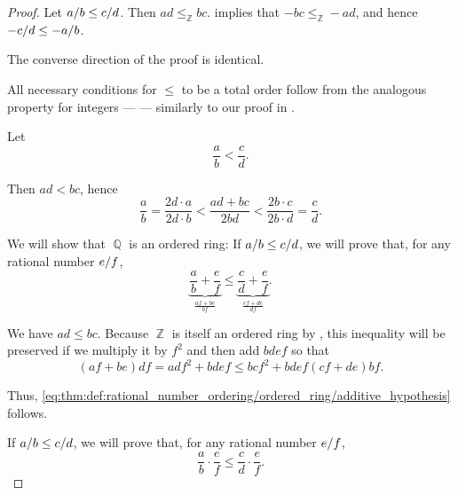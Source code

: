 \begin{proof}
   Let \( \ifrac a b \leq \ifrac c d \). Then \( ad \leq_\BbbZ bc \).  implies that \( -bc \leq_\BbbZ -ad \), and hence \( - \ifrac c d \leq - \ifrac a b \).

  The converse direction of the proof is identical.

   All necessary conditions for \( \leq \) to be a total order follow from the analogous property for integers ---  --- similarly to our proof in .

   Let
  \begin{equation*}
    \frac a b < \frac c d.
  \end{equation*}

  Then \( ad < bc \), hence
  \begin{equation*}
    \frac a b = \frac {2d \cdot a} {2d \cdot b} < \frac {ad + bc} {2bd} < \frac {2b \cdot c} {2b \cdot d} = \frac c d.
  \end{equation*}

   We will show that \( \BbbQ \) is an ordered ring:
   If \( \ifrac a b \leq \ifrac c d \), we will prove that, for any rational number \( \ifrac e f \),
  \begin{equation}\label{eq:thm:def:rational_number_ordering/ordered_ring/additive_hypothesis}
    \underbrace{\frac a b + \frac e f}_{\frac {af + be} {bf}} \leq \underbrace{\frac c d  + \frac e f}_{\frac {cf + de} {df}}.
  \end{equation}

  We have \( ad \leq bc \). Because \( \BbbZ \) is itself an ordered ring by , this inequality will be preserved if we multiply it by \( f^2 \) and then add \( bdef \) so that
  \begin{equation*}
    (af + be) df = adf^2 + bdef \leq bcf^2 + bdef (cf + de) bf.
  \end{equation*}

  Thus, \eqref{eq:thm:def:rational_number_ordering/ordered_ring/additive_hypothesis} follows.

   If \( \ifrac a b \leq \ifrac c d \), we will prove that, for any rational number \( \ifrac e f \),
  \begin{equation}\label{eq:thm:def:rational_number_ordering/ordered_ring/multiplicative_hypothesis}
    \frac a b \cdot \frac e f \leq \frac c d \cdot \frac e f.
  \end{equation}


\end{proof}
